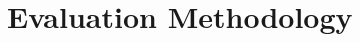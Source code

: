 \documentclass[conference]{IEEEtran}
\begin{document}

\section {Evaluation Methodology} \label{EvaluationMethodology}
\end{document}
